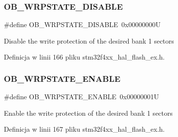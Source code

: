 \subsubsection{\texorpdfstring{O\+B\+\_\+\+W\+R\+P\+S\+T\+A\+T\+E\+\_\+\+D\+I\+S\+A\+B\+LE}{OB\_WRPSTATE\_DISABLE}}
{\footnotesize\ttfamily \#define O\+B\+\_\+\+W\+R\+P\+S\+T\+A\+T\+E\+\_\+\+D\+I\+S\+A\+B\+LE~0x00000000U}

Disable the write protection of the desired bank 1 sectors 

Definicja w linii 166 pliku stm32f4xx\+\_\+hal\+\_\+flash\+\_\+ex.\+h.

\mbox{\label{group___f_l_a_s_h_ex___w_r_p___state_ga9fc463145ab57616baa36d95523186a1}} 
\subsubsection{\texorpdfstring{O\+B\+\_\+\+W\+R\+P\+S\+T\+A\+T\+E\+\_\+\+E\+N\+A\+B\+LE}{OB\_WRPSTATE\_ENABLE}}
{\footnotesize\ttfamily \#define O\+B\+\_\+\+W\+R\+P\+S\+T\+A\+T\+E\+\_\+\+E\+N\+A\+B\+LE~0x00000001U}

Enable the write protection of the desired bank 1 sectors 

Definicja w linii 167 pliku stm32f4xx\+\_\+hal\+\_\+flash\+\_\+ex.\+h.

